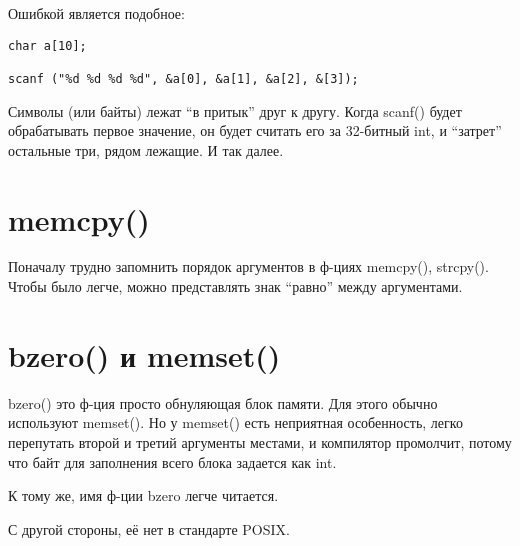 Ошибкой является подобное:

\begin{lstlisting}
char a[10];

scanf ("%d %d %d %d", &a[0], &a[1], &a[2], &[3]);
\end{lstlisting}

Символы (или байты) лежат ``в притык'' друг к другу. Когда scanf() будет обрабатывать первое значение, он будет считать
его за 32-битный int, и ``затрет'' остальные три, рядом лежащие. И так далее.

\label{memcpy}
\section{memcpy()}

Поначалу трудно запомнить порядок аргументов в ф-циях memcpy(), strcpy(). Чтобы было легче, можно представлять
знак ``равно'' между аргументами.

\label{bzero}
\section{bzero() и memset()}

bzero() это ф-ция просто обнуляющая блок памяти.
Для этого обычно используют memset(). Но у memset() есть неприятная особенность, легко перепутать второй
и третий аргументы местами, и компилятор промолчит, потому что байт для заполнения всего блока задается как int.

К тому же, имя ф-ции bzero легче читается.

С другой стороны, её нет в стандарте POSIX.

